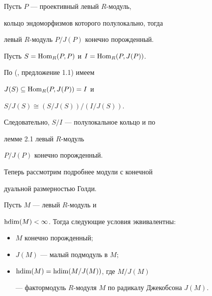 \begin{cors}


Пусть $P$ --- проективный левый $R$-модуль,


кольцо эндоморфизмов которого полулокально, тогда


левый $R$-модуль $P/J(P)$ конечно порожденный. 


\end{cors} 





\begin{pf}


Пусть $S=\operatorname{Hom}_R(P,P)$ и $I=\operatorname{Hom}_R(P,J(P))$.


По (\cite{ware}, предложение 1.1) имеем 


$J(S) \subseteq \operatorname{Hom}_R(P,J(P))=I$ и 


$S/J(S) \cong (S/J(S))/(I/J(S))$.


Следовательно, $S/I$ --- полулокальное кольцо и по


лемме 2.1 левый $R$-модуль 


$P/J(P)$ конечно порожденный.


\end{pf}


 


Теперь рассмотрим подробнее модули с конечной 


дуальной размерностью Голди. 





\begin{thms}\label{Maintheorem}


Пусть $M$ --- левый $R$-модуль и


$\operatorname{hdim} (M)< \infty $. Тогда следующие условия эквивалентны\/${:}$ 


\begin{itemize} 


\item[(a)] $M$ конечно порожденный\/$;$ 


\item[(b)] $J(M)$ --- малый подмодуль в $M;$


\item[(c)] $\operatorname{hdim} (M) = \operatorname{hdim} (M/J(M))$, где $M/J(M)$ 


--- фактормодуль $R$-модуля $M$ по радикалу Джекобсона $J(M)$.


\end{itemize}


\end{thms}





